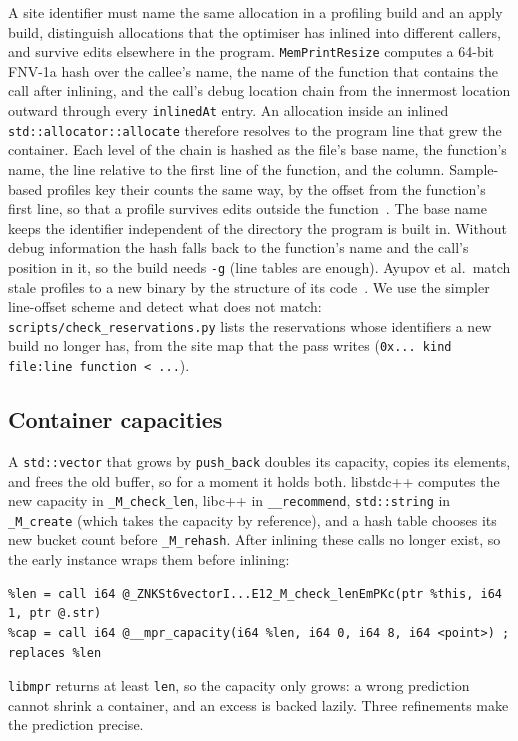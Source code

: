 \documentclass[11pt]{article}
\newcommand{\libmpr}{\texttt{libmpr}}
\newcommand{\pass}{\texttt{MemPrintResize}}
\begin{document}
A site identifier must name the same allocation in a profiling build and an apply build, distinguish
allocations that the optimiser has inlined into different callers, and survive edits elsewhere in the program.
\pass{} computes a 64-bit FNV-1a hash over the callee's name, the name of the function that contains the call
after inlining, and the call's debug location chain from the innermost location outward through every
\texttt{inlinedAt} entry. An allocation inside an inlined \texttt{std::allocator::allocate} therefore resolves to the
program line that grew the container. Each level of the chain is hashed as the file's base name, the function's
name, the line relative to the first line of the function, and the column. Sample-based profiles key their counts
the same way, by the offset from the function's first line, so that a profile survives edits outside the
function~\cite{Chen2016AutoFDO,ClangSampleProfile}. The base name keeps the identifier independent of the directory
the program is built in. Without debug information the hash falls back to the function's name and the call's
position in it, so the build needs \texttt{-g} (line tables are enough). Ayupov et al.\ match stale profiles to a
new binary by the structure of its code~\cite{Ayupov2024Stale}. We use the simpler line-offset scheme and detect
what does not match: \texttt{scripts/check\_reservations.py} lists the reservations whose identifiers a new build no
longer has, from the site map that the pass writes (\texttt{0x... kind file:line function < ...}).

\subsection{Container capacities}
\label{sec:pass-capacity}

A \texttt{std::vector} that grows by \texttt{push\_back} doubles its capacity, copies its elements, and frees the old
buffer, so for a moment it holds both. libstdc++ computes the new capacity in \texttt{\_M\_check\_len}, libc++ in
\texttt{\_\_recommend}, \texttt{std::string} in \texttt{\_M\_create} (which takes the capacity by reference), and a hash
table chooses its new bucket count before \texttt{\_M\_rehash}. After inlining these calls no longer exist, so the
early instance wraps them before inlining:
\begin{lstlisting}
%len = call i64 @_ZNKSt6vectorI...E12_M_check_lenEmPKc(ptr %this, i64 1, ptr @.str)
%cap = call i64 @__mpr_capacity(i64 %len, i64 0, i64 8, i64 <point>) ; replaces %len
\end{lstlisting}
\libmpr{} returns at least \texttt{len}, so the capacity only grows: a wrong prediction cannot shrink a container,
and an excess is backed lazily. Three refinements make the prediction precise.
\end{document}
